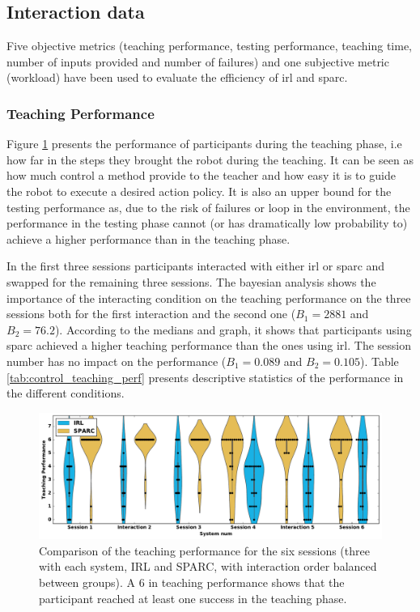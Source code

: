 \subsection{Interaction data}

Five objective metrics (teaching performance, testing performance, teaching time, number of inputs provided and number of failures) and one subjective metric (workload) have been used to evaluate the efficiency of \gls{irl} and \gls{sparc}. 

\subsubsection{Teaching Performance}

Figure \ref{fig:control_teaching_performance} presents the performance of participants during the teaching phase, i.e how far in the steps they brought the robot during the teaching. It can be seen as how much control a method provide to the teacher and how easy it is to guide the robot to execute a desired action policy. It is also an upper bound for the testing performance as, due to the risk of failures or loop in the environment, the performance in the testing phase cannot (or has dramatically low probability to) achieve a higher performance than in the teaching phase.

In the first three sessions participants interacted with either \gls{irl} or \gls{sparc} and swapped for the remaining three sessions. The bayesian analysis shows the importance of the interacting condition on the teaching performance on the three sessions both for the first interaction and the second one ($B_1=2881$ and $B_2 = 76.2$). According to the medians and graph, it shows that participants using \gls{sparc} achieved a higher teaching performance than the ones using \gls{irl}. The session number has no impact on the performance ($B_1=0.089$ and $B_2=0.105$). Table \ref{tab:control_teaching_perf} presents descriptive statistics of the performance in the different conditions.


\begin{figure}[ht]
	\includegraphics[width=\textwidth]{teaching_performance.pdf}
	\centering
	\caption{Comparison of the teaching performance for the six sessions (three with each system, IRL and SPARC, with interaction order balanced between groups). A 6 in teaching performance shows that the participant reached at least one success in the teaching phase.
	}
	\label{fig:control_teaching_performance}
\end{figure}

